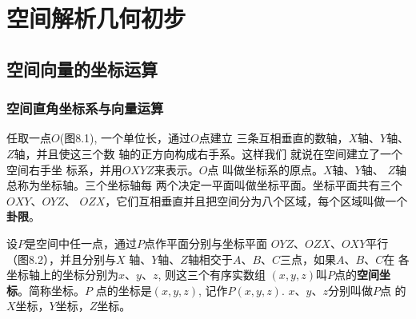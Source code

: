 
\chapter{空间解析几何初步}
\section{空间向量的坐标运算}
\subsection{空间直角坐标系与向量运算}
任取一点$O$(图8.1), 一个单位长，通过$O$点建立
三条互相垂直的数轴，$X$轴、$Y$轴、$Z$轴，并且使这三个数
轴的正方向构成右手系。这样我们
就说在空间建立了一个空间右手坐
标系，并用$OXYZ$来表示。$O$点
叫做坐标系的原点。$X$轴、$Y$轴、
$Z$轴总称为坐标轴。三个坐标轴每
两个决定一平面叫做坐标平面。坐标平面共有三个$OXY$、$OYZ$、
$OZX$，它们互相垂直并且把空间分为八个区域，每个区域叫做一个\textbf{卦限}。

\begin{figure}[htp]\centering
    \begin{minipage}[t]{0.48\textwidth}
    \centering
{}
    \caption{}
    \end{minipage}
    \begin{minipage}[t]{0.48\textwidth}
    \centering
    \caption{}
    \end{minipage}
    \end{figure}

设$P$是空间中任一点，通过$P$点作平面分别与坐标平面
$OYZ$、$OZX$、$OXY$平行（图8.2），并且分别与$X$
轴、$Y$轴、$Z$轴相交于$A$、$B$、$C$三点，如果$A$、$B$、$C$在
各坐标轴上的坐标分别为$x$、$y$、$z$, 则这三个有序实数组
$(x,y,z)$叫$P$点的\textbf{空间坐标}。简称坐标。$P$
点的坐标是$(x,y,z)$, 
记作$P(x,y,z)$. $x$、$y$、$z$分别叫做$P$点
的$X$坐标，$Y$坐标，$Z$坐标。

